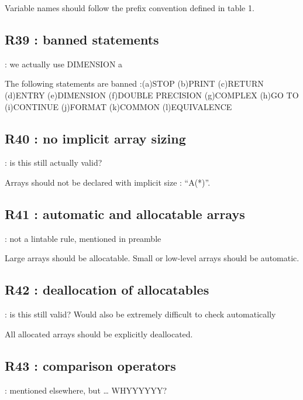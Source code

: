 \documentclass[letterpaper,10pt,english]{sphinxmanual}
\begin{document}
Variable names should follow the prefix convention defined in table 1.


\subsection{R39 :  banned statements}
\label{\detokenize{obsolescent/r39:r39-banned-statements}}\label{\detokenize{obsolescent/r39::doc}}
 : we actually use DIMENSION a 

The following statements are banned :(a)STOP (b)PRINT (c)RETURN (d)ENTRY (e)DIMENSION (f)DOUBLE PRECISION (g)COMPLEX
(h)GO TO (i)CONTINUE (j)FORMAT (k)COMMON (l)EQUIVALENCE


\subsection{R40 :  no implicit array sizing}
\label{\detokenize{obsolescent/r40:r40-no-implicit-array-sizing}}\label{\detokenize{obsolescent/r40::doc}}
 : is this still actually valid?

Arrays should not be declared with implicit size : “A(*)”.


\subsection{R41 :  automatic and allocatable arrays}
\label{\detokenize{obsolescent/r41:r41-automatic-and-allocatable-arrays}}\label{\detokenize{obsolescent/r41::doc}}
 : not a lintable rule, mentioned in preamble

Large arrays should be allocatable. Small or low-level arrays should be automatic.


\subsection{R42 : deallocation of allocatables}
\label{\detokenize{obsolescent/r42:r42-deallocation-of-allocatables}}\label{\detokenize{obsolescent/r42::doc}}
 : is this still valid? Would also be extremely difficult to check automatically

All allocated arrays should be explicitly deallocated.


\subsection{R43 : comparison operators}
\label{\detokenize{obsolescent/r43:r43-comparison-operators}}\label{\detokenize{obsolescent/r43::doc}}
 : mentioned elsewhere, but … WHYYYYYY?
\end{document}

